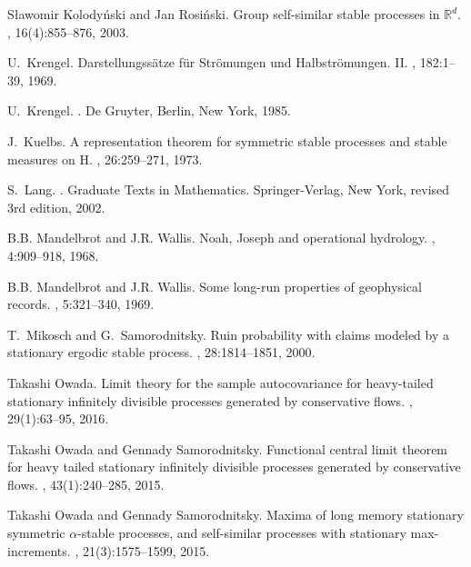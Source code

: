 \documentclass[12pt]{amsart}
\begin{document}
\begin{thebibliography}{10}
	S{\l}awomir Kolody{\'n}ski and Jan Rosi{\'n}ski.
	\newblock Group self-similar stable processes in $\mathbb{R}^d$.
	, 16(4):855--876, 2003.
	
	U.~Krengel.
	\newblock Darstellungss\"atze f\"ur {S}tr\"omungen und {H}albstr\"omungen.
	{II}.
	, 182:1--39, 1969.
	
	U.~Krengel.
	.
	\newblock De Gruyter, Berlin, New York, 1985.
	
	J.~Kuelbs.
	\newblock A representation theorem for symmetric stable processes and stable
	measures on {H}.
	, 26:259--271, 1973.
	
	S.~Lang.
	.
	\newblock Graduate Texts in Mathematics. Springer-Verlag, New York, revised 3rd
	edition, 2002.
	
	B.B. Mandelbrot and J.R. Wallis.
	\newblock Noah, {J}oseph and operational hydrology.
	, 4:909--918, 1968.
	
	B.B. Mandelbrot and J.R. Wallis.
	\newblock Some long-run properties of geophysical records.
	, 5:321--340, 1969.
	
	T.~Mikosch and G.~Samorodnitsky.
	\newblock Ruin probability with claims modeled by a stationary ergodic stable
	process.
	, 28:1814--1851, 2000.
	
	Takashi Owada.
	\newblock Limit theory for the sample autocovariance for heavy-tailed
	stationary infinitely divisible processes generated by conservative flows.
	, 29(1):63--95, 2016.
	
	Takashi Owada and Gennady Samorodnitsky.
	\newblock Functional central limit theorem for heavy tailed stationary
	infinitely divisible processes generated by conservative flows.
	, 43(1):240--285, 2015.
	
	Takashi Owada and Gennady Samorodnitsky.
	\newblock Maxima of long memory stationary symmetric $\alpha $-stable
	processes, and self-similar processes with stationary max-increments.
	, 21(3):1575--1599, 2015.
	

\end{thebibliography}
\end{document}
